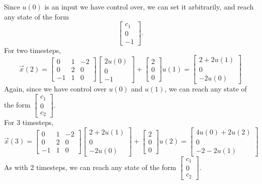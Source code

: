\begin{enumerate}
{        Since $u(0)$ is an input we have control over, we can set it arbitrarily, and reach any state of the form
        \[ \begin{bmatrix} c_1 \\ 0 \\ -1\end{bmatrix}. \]
        For two timesteps,
        \[\vec{x}(2) =
        \begin{bmatrix}
            0 & 1 & -2 \\
            0 & 2 & 0 \\
            -1 & 1 & 0
        \end{bmatrix}
        \begin{bmatrix}
            2u(0) \\ 0 \\ -1
        \end{bmatrix}
        + \begin{bmatrix}
            2 \\ 0 \\ 0
        \end{bmatrix} u(1) =
        \begin{bmatrix}
            2 + 2u(1) \\ 0 \\ -2u(0)
        \end{bmatrix}\]
        Again, since we have control over $u(0)$ and $u(1)$, we can reach any state of the form $\begin{bmatrix} c_1 \\ 0 \\ c_2 \end{bmatrix}$. \\
        \newline
        For 3 timesteps,
        \[\vec{x}(3) =
        \begin{bmatrix}
            0 & 1 & -2 \\
            0 & 2 & 0 \\
            -1 & 1 & 0
        \end{bmatrix}
        \begin{bmatrix}
            2 + 2u(1) \\ 0 \\ -2u(0)
        \end{bmatrix}
        + \begin{bmatrix}
            2 \\ 0 \\ 0
        \end{bmatrix} u(2) =
        \begin{bmatrix}
            4u(0) + 2u(2) \\ 0 \\ -2 - 2u(1)
        \end{bmatrix}\]
        As with 2 timesteps, we can reach any state of the form $\begin{bmatrix} c_1 \\ 0 \\ c_2 \end{bmatrix}$.
    }


\end{enumerate}
